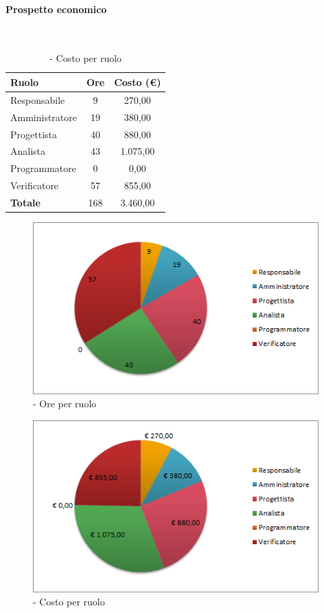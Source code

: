 \documentclass[./PianoDiProgetto.tex]{subfiles}
\begin{document}
	\paragraph{Prospetto economico}\
					
	\begin{table}[H]
		\centering
	
		\begin{tabular}{l * {2}{c}}
			\toprule
			\textbf{Ruolo} & \textbf{Ore} & \textbf{Costo (\euro{})} \\
			\midrule
			Responsabile & 9    &  270,00 \\
			Amministratore  & 19     &  380,00 \\
			Progettista  & 40    &  880,00 \\
			Analista & 43   &  1.075,00 \\
			Programmatore  & 0    &  0,00 \\
			Verificatore  & 57    &  855,00 \\
			\midrule
			\textbf{Totale}  & 168   &  3.460,00 \\
			\bottomrule		
		\end{tabular}
		\caption{\PerPD{} - Costo per ruolo}
		
	\end{table}
\vfill	
\newpage
\vfill
	
	\begin{figure}[H]
		\centering
		\includegraphics[width=11cm, trim=1cm 0cm 1cm 0cm]{grafici/PD-ruolo}
			\caption{\PerPD{}- Ore per ruolo}
		
	\end{figure}

\vfill	
	\begin{figure}[H]
		\centering
		\includegraphics[width=11cm, trim=1cm 0cm 1cm 0cm]{grafici/PD-costo}
			\caption{\PerPD{} - Costo per ruolo}
	\end{figure}
\vfill	
\newpage	
	
\end{document}
